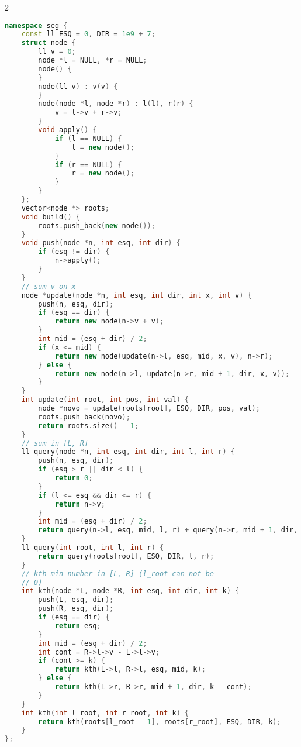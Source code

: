 \documentclass[11pt, a4paper, oneside]{book}
\begin{document}
\begin{multicols}{2}
\begin{lstlisting}[language=C++]
namespace seg {
    const ll ESQ = 0, DIR = 1e9 + 7;
    struct node {
        ll v = 0;
        node *l = NULL, *r = NULL;
        node() {
        }
        node(ll v) : v(v) {
        }
        node(node *l, node *r) : l(l), r(r) {
            v = l->v + r->v;
        }
        void apply() {
            if (l == NULL) {
                l = new node();
            }
            if (r == NULL) {
                r = new node();
            }
        }
    };
    vector<node *> roots;
    void build() {
        roots.push_back(new node());
    }
    void push(node *n, int esq, int dir) {
        if (esq != dir) {
            n->apply();
        }
    }
    // sum v on x
    node *update(node *n, int esq, int dir, int x, int v) {
        push(n, esq, dir);
        if (esq == dir) {
            return new node(n->v + v);
        }
        int mid = (esq + dir) / 2;
        if (x <= mid) {
            return new node(update(n->l, esq, mid, x, v), n->r);
        } else {
            return new node(n->l, update(n->r, mid + 1, dir, x, v));
        }
    }
    int update(int root, int pos, int val) {
        node *novo = update(roots[root], ESQ, DIR, pos, val);
        roots.push_back(novo);
        return roots.size() - 1;
    }
    // sum in [L, R]
    ll query(node *n, int esq, int dir, int l, int r) {
        push(n, esq, dir);
        if (esq > r || dir < l) {
            return 0;
        }
        if (l <= esq && dir <= r) {
            return n->v;
        }
        int mid = (esq + dir) / 2;
        return query(n->l, esq, mid, l, r) + query(n->r, mid + 1, dir, l, r);
    }
    ll query(int root, int l, int r) {
        return query(roots[root], ESQ, DIR, l, r);
    }
    // kth min number in [L, R] (l_root can not be
    // 0)
    int kth(node *L, node *R, int esq, int dir, int k) {
        push(L, esq, dir);
        push(R, esq, dir);
        if (esq == dir) {
            return esq;
        }
        int mid = (esq + dir) / 2;
        int cont = R->l->v - L->l->v;
        if (cont >= k) {
            return kth(L->l, R->l, esq, mid, k);
        } else {
            return kth(L->r, R->r, mid + 1, dir, k - cont);
        }
    }
    int kth(int l_root, int r_root, int k) {
        return kth(roots[l_root - 1], roots[r_root], ESQ, DIR, k);
    }
};
\end{lstlisting}
\end{multicols}

\hfill
\end{document}

